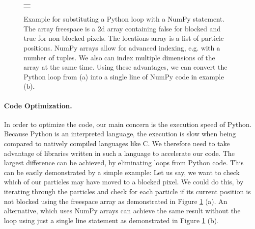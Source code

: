 \begin{figure}[htp]
    \begin{center}
        \begin{tabular}{c}
            \parbox{0.9\columnwidth}{} \\
             \\
            \addlinespace[0.5cm]
            \parbox{0.9\columnwidth}{} \\
             \\
            
        \end{tabular}
    \end{center}
    \vspace{-0.25cm}
    \caption[Example for Python Loop Substitution with NumPy]{Example for substituting a Python loop with a NumPy statement. The array freespace is a 2d array containing false for blocked and true for non-blocked pixels. The locations array is a list of particle positions. NumPy arrays allow for advanced indexing, e.g. with a number of tuples. We also can index multiple dimensions of the array at the same time. Using these advantages, we can convert the Python loop from (a) into a single line of NumPy code in example (b).} \label{fig:MazeImplementation/Loops}
\end{figure}


\paragraph{Code Optimization. }
In order to optimize the code, our main concern is the execution speed of Python. Because Python is an interpreted language, the execution is slow when being compared to natively compiled languages like C. We therefore need to take advantage of libraries written in such a language to accelerate our code. The largest difference can be achieved, by eliminating loops from Python code. This can be easily demonstrated by a simple example: Let us say, we want to check which of our particles may have moved to a blocked pixel. We could do this, by iterating through the particles and check for each particle if its current position is not blocked using the freespace array  as demonstrated in Figure \ref{fig:MazeImplementation/Loops} (a). An alternative, which uses NumPy arrays can achieve the same result without the loop using just a single line statement as demonstrated in Figure \ref{fig:MazeImplementation/Loops} (b). 

